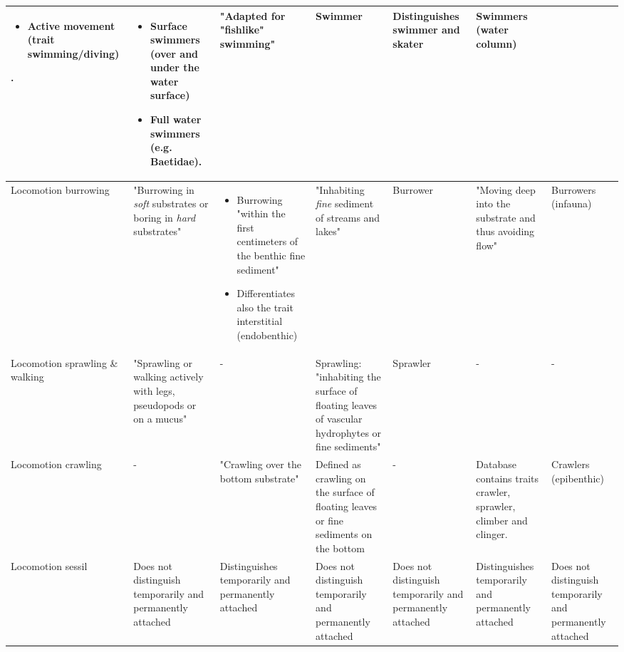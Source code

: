\documentclass[../Draft_harmonization_paper.tex]{subfiles}
\begin{document}
\begin{landscape}
\begin{longtable}{m{1.9cm}|m{3.3cm}|m{3.3cm}|m{2.7cm}|m{3cm}|m{3.2cm}|m{2.5cm}}
\begin{itemize}
            \item Active movement (trait swimming/diving)
        \end{itemize}. &
        \begin{itemize}
            \item Surface swimmers (over and under the water surface)
            \item Full water swimmers (e.g. Baetidae).
        \end{itemize} & 
        "Adapted for "fishlike" swimming" & 
        Swimmer & 
        Distinguishes swimmer and skater & 
        Swimmers (water column)
        \\
        \midrule
        Locomotion burrowing & 
        "Burrowing in \textit{soft} substrates or boring in \textit{hard} substrates" & 
        \begin{itemize}
            \item Burrowing "within the first centimeters of the benthic fine sediment"
            \item Differentiates also the trait interstitial (endobenthic)
        \end{itemize} & 
        "Inhabiting \textit{fine} sediment of streams and lakes" &
        Burrower & 
        "Moving deep into the substrate and thus avoiding flow" &
        Burrowers (infauna)
        \\
        \midrule
        Locomotion sprawling \& walking & 
        "Sprawling or walking actively with legs, pseudopods or on a mucus" &
        - & 
        Sprawling: "inhabiting the surface of floating leaves of vascular hydrophytes or fine sediments" & 
        Sprawler &
        - & 
        - \\
        \midrule
        Locomotion crawling & 
        - &
        "Crawling over the bottom substrate" & 
        Defined as crawling on the surface of floating leaves or fine sediments on the bottom & 
        - & 
        Database contains traits crawler, 
        sprawler, climber and clinger. &
        Crawlers (epibenthic) \\
        \midrule
        Locomotion sessil & 
        Does not distinguish temporarily and permanently attached & 
        Distinguishes temporarily and permanently attached & 
        Does not distinguish temporarily and permanently attached & 
        Does not distinguish temporarily and permanently attached & 
        Distinguishes temporarily and permanently attached & 
        Does not distinguish temporarily and permanently attached \\

\end{longtable}
\end{landscape}
\end{document}
